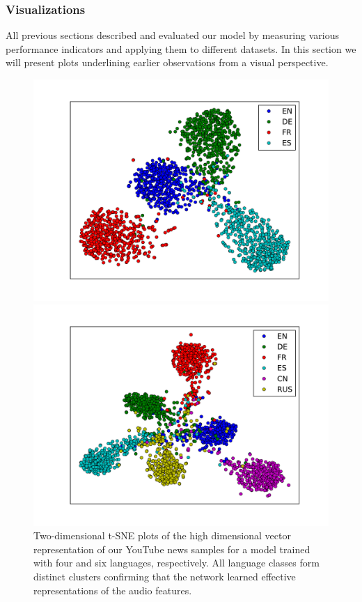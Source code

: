 \subsubsection{Visualizations} 
\label{sec:visualization}
All previous sections described and evaluated our model by measuring various performance indicators and applying them to different datasets. In this section we will present plots underlining earlier observations from a visual perspective.
	
	\begin{figure}
	\centering
	\begin{minipage}{.5\textwidth}
	  \centering
	  \includegraphics[width=\linewidth]{plots/tsne.pdf}
	\end{minipage}%
	\begin{minipage}{.5\textwidth}
	  \centering
	  \includegraphics[width=\linewidth]{plots/tsne_6lang.pdf}
	\end{minipage}
	\caption{Two-dimensional t-SNE plots of the high dimensional vector representation of our YouTube news samples for a model trained with four and six languages,  respectively. All language classes form distinct clusters confirming that the network learned effective representations of the audio features.}
	\label{fig:tsne}
	\end{figure}

